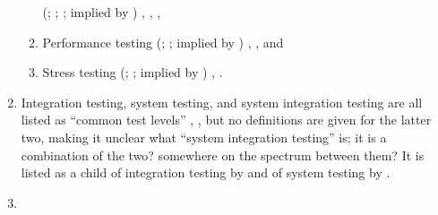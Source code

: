 \begin{enumerate}
\begin{enumerate}
                    \ifnotpaper
                        (\citealp[pp.~5,~20,~22]{IEEE2022};
                        \citeyear[p.~253]{IEEE2017};
                        \citealpISTQB{}; implied by \citealp[p.~54]{Firesmith2015})%
                    \else
                        \cite[p.~253]{IEEE2017},
                        \cite{ISTQB}, \cite[pp.~5,~20,~22]{IEEE2022}%
                    \fi,
              \item Performance testing
                    \ifnotpaper
                        (\citealp[pp.~7,~22,~26-27]{IEEE2022};
                        \citeyear[p.~7]{IEEE2021}; implied by
                        \citealp[p.~53]{Firesmith2015})%
                    \else
                        \cite[pp.~7,~22,~26-27]{IEEE2022}, \cite[p.~7]{IEEE2021}%
                    \fi, and
              \item Stress testing
                    \ifnotpaper
                        (\citealp[pp.~9,~22]{IEEE2022};
                        \citeyear[p.~442]{IEEE2017}; implied by
                        \citealp[p.~54]{Firesmith2015})%
                    \else
                        \cite[p.~442]{IEEE2017}, \cite[pp.~9,~22]{IEEE2022}%
                    \fi.
          \end{enumerate}
    \item %
          Integration testing, system testing, and system integration testing
          are all listed as ``common test levels'' \ifnotpaper
              \citetext{\citealp[p.~12]{IEEE2022}; \citeyear[p.~6]{IEEE2021}}%
          \else
              \cite[p.~12]{IEEE2022}, \cite[p.~6]{IEEE2021}%
          \fi, but no
          definitions are given for the latter two, making it unclear what
          ``system integration testing'' is; it is a combination of the two?
          somewhere on the spectrum between them? It is listed as a child
          of integration testing by \citetISTQB{}
          and of system testing by \citet[p.~23]{Firesmith2015}.
    \item %

\end{enumerate}

